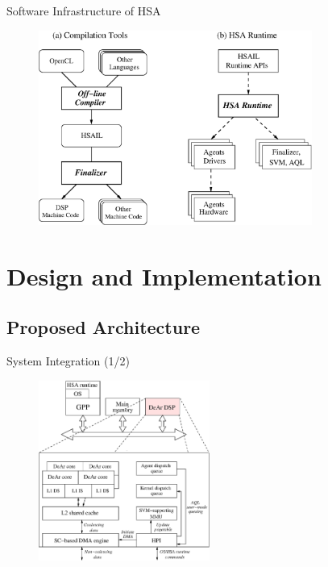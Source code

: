 \documentclass{beamer}
\begin{document}
\begin{CJK}{UTF8}{bkai}
    \begin{frame}{Software Infrastructure of HSA}
        \begin{figure}[!ht] 
            \centering
            \includegraphics[width=0.8\textwidth]{./figs/swinf.eps}
            \label{fig:swinf}
        \end{figure}
    \end{frame}


    \section{Design and Implementation}
    \subsection{Proposed Architecture}

    \begin{frame}{System Integration (1/2)}
        \begin{figure}[!ht] 
            \centering
            \includegraphics[width=0.5\textwidth]{./figs/archi.eps}
            \label{fig:archi}
        \end{figure}
    \end{frame}


\end{CJK}
\end{document}
